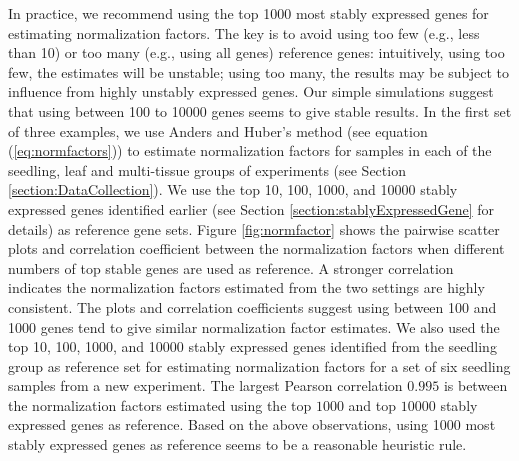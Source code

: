 \documentclass[letterpaper,12pt]{article}
\begin{document}
%

In practice, we recommend using the top 1000 most stably expressed genes for
estimating normalization factors. The key is to avoid using too few (e.g.,
less than 10) or too many (e.g., using all genes) reference genes:
intuitively, using too few, the estimates will be unstable; using too many,
the results may be subject to influence from highly unstably expressed genes.
Our simple simulations suggest that using between 100 to 10000 genes seems to
give stable results. In the first set of three examples, we use Anders and
Huber's method (see equation (\ref{eq:normfactors})) to estimate normalization
factors for samples in each of the seedling, leaf and multi-tissue groups of
experiments (see Section \ref{section:DataCollection}).  We use the top 10,
100, 1000, and 10000 stably expressed genes identified earlier (see Section
\ref{section:stablyExpressedGene} for details) as reference gene sets. Figure
\ref{fig:normfactor} shows the pairwise scatter plots and correlation
coefficient between the normalization factors when different numbers of top
stable genes are used as reference. A stronger correlation indicates the
normalization factors estimated from the two settings are highly consistent.
The plots and correlation coefficients suggest using between 100 and 1000
genes tend to give similar normalization factor estimates. We also used the
top 10, 100, 1000, and 10000 stably expressed genes identified from the
seedling group as reference set for estimating normalization factors for a set
of six seedling samples from a new experiment. The largest Pearson correlation
$0.995$ is between the normalization factors estimated using the top $1000$
and top $10000$ stably expressed genes as reference. Based on the above
observations, using 1000 most stably expressed genes as reference seems to be
a reasonable heuristic rule.

\end{document}
